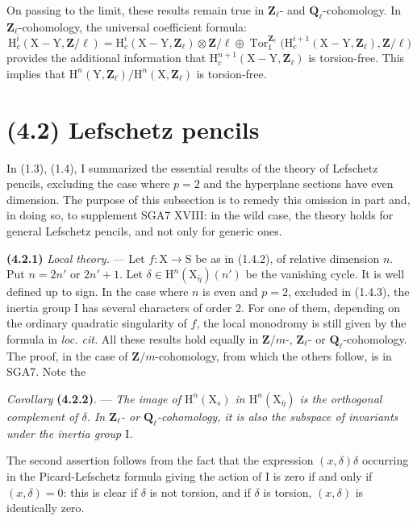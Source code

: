 \documentclass[11pt,leqno]{article}
\begin{document}
On passing to the limit, these results remain true in \(\mathbf{Z}_\ell\)- and \(\mathbf{Q}_\ell\)-cohomology. In \(\mathbf{Z}_\ell\)-cohomology, the universal coefficient formula:
\[
\mathrm{H}_c^i(\mathrm{X}-\mathrm{Y},\mathbf{Z}/\ell)
=
\mathrm{H}_c^i(\mathrm{X}-\mathrm{Y},\mathbf{Z}_\ell)
\otimes\mathbf{Z}/\ell
\oplus
\operatorname{Tor}_1^{\mathbf{Z}_\ell}
\bigl(\mathrm{H}_c^{i+1}(\mathrm{X}-\mathrm{Y},\mathbf{Z}_\ell),\mathbf{Z}/\ell\bigr)
\]
provides the additional information that \(\mathrm{H}_c^{n+1}(\mathrm{X}-\mathrm{Y},\mathbf{Z}_\ell)\) is torsion-free. This implies that \(\mathrm{H}^n(\mathrm{Y},\mathbf{Z}_\ell)/\mathrm{H}^n(\mathrm{X},\mathbf{Z}_\ell)\) is torsion-free.

\section*{(4.2) Lefschetz pencils}

In (1.3), (1.4), I summarized the essential results of the theory of Lefschetz pencils, excluding the case where \(p=2\) and the hyperplane sections have even dimension. The purpose of this subsection is to remedy this omission in part and, in doing so, to supplement SGA7 XVIII: in the wild case, the theory holds for general Lefschetz pencils, and not only for generic ones.

\textbf{(4.2.1)} \textit{Local theory.} — Let \(f:\mathrm{X}\to\mathrm{S}\) be as in (1.4.2), of relative dimension \(n\). Put \(n=2n'\) or \(2n'+1\). Let \(\delta\in\mathrm{H}^n(\mathrm{X}_{\bar\eta})(n')\) be the vanishing cycle. It is well defined up to sign. In the case where \(n\) is even and \(p=2\), excluded in (1.4.3), the inertia group \(\mathrm{I}\) has several characters of order 2. For one of them, depending on the ordinary quadratic singularity of \(f\), the local monodromy is still given by the formula in \textit{loc. cit.} All these results hold equally in \(\mathbf{Z}/m\)-, \(\mathbf{Z}_\ell\)- or \(\mathbf{Q}_\ell\)-cohomology. The proof, in the case of \(\mathbf{Z}/m\)-cohomology, from which the others follow, is in SGA7. Note the

\textit{Corollary} \textbf{(4.2.2)}. — \textit{The image of \(\mathrm{H}^n(\mathrm{X}_s)\) in \(\mathrm{H}^n(\mathrm{X}_{\bar\eta})\) is the orthogonal complement of \(\delta\). In \(\mathbf{Z}_\ell\)- or \(\mathbf{Q}_\ell\)-cohomology, it is also the subspace of invariants under the inertia group \(\mathrm{I}\).}

The second assertion follows from the fact that the expression \((x,\delta)\delta\) occurring in the Picard-Lefschetz formula giving the action of \(\mathrm{I}\) is zero if and only if \((x,\delta)=0\): this is clear if \(\delta\) is not torsion, and if \(\delta\) is torsion, \((x,\delta)\) is identically zero.
\end{document}
